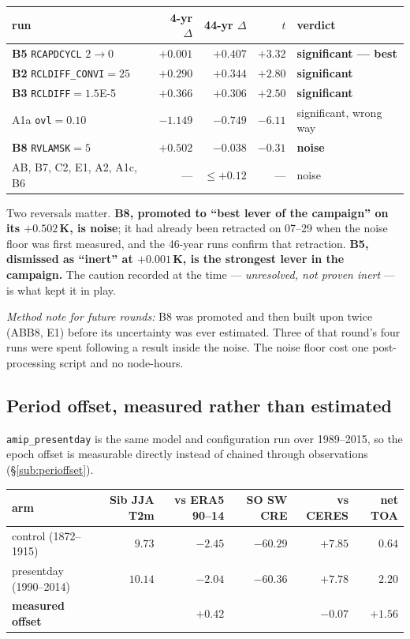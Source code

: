 \documentclass[10pt]{article}
\begin{document}
\begin{center}\footnotesize
\begin{tabular}{l r r r l}
\toprule
run & 4-yr $\Delta$ & \textbf{44-yr $\Delta$} & $t$ & verdict \\
\midrule
\textbf{B5} \texttt{RCAPDCYCL} $2\to0$   & $+0.001$ & $\mathbf{+0.407}$ & $+3.32$ & \textbf{significant --- best} \\
\textbf{B2} \texttt{RCLDIFF\_CONVI}$=25$ & $+0.290$ & $\mathbf{+0.344}$ & $+2.80$ & \textbf{significant} \\
\textbf{B3} \texttt{RCLDIFF}$=1.5$E-5    & $+0.366$ & $\mathbf{+0.306}$ & $+2.50$ & \textbf{significant} \\
A1a \texttt{ovl}$=0.10$                  & $-1.149$ & $-0.749$ & $-6.11$ & significant, wrong way \\
\textbf{B8} \texttt{RVLAMSK}$=5$         & $\mathbf{+0.502}$ & $\mathbf{-0.038}$ & $-0.31$ & \textbf{noise} \\
AB, B7, C2, E1, A2, A1c, B6              & --- & $\le+0.12$ & --- & noise \\
\bottomrule
\end{tabular}
\end{center}

\noindent Two reversals matter. \textbf{B8, promoted to ``best lever of the campaign'' on its $+0.502$\,K, is
noise}; it had already been retracted on 07--29 when the noise floor was first measured, and the 46-year runs
confirm that retraction. \textbf{B5, dismissed as ``inert'' at $+0.001$\,K, is the strongest lever in the
campaign.} The caution recorded at the time --- \emph{unresolved, not proven inert} --- is what kept it in play.

\emph{Method note for future rounds:} B8 was promoted and then built upon twice (ABB8, E1) before its uncertainty
was ever estimated. Three of that round's four runs were spent following a result inside the noise. The noise
floor cost one post-processing script and no node-hours.

\subsection{Period offset, measured rather than estimated}\label{sub:perdirect}
\texttt{amip\_presentday} is the same model and configuration run over 1989--2015, so the epoch offset is
measurable directly instead of chained through observations (\S\ref{sub:perioffset}).

\begin{center}\footnotesize
\begin{tabular}{l r r r r r}
\toprule
arm & Sib JJA T2m & vs ERA5 90--14 & SO SW CRE & vs CERES & net TOA \\
\midrule
control (1872--1915)     & $9.73$  & $\mathbf{-2.45}$ & $-60.29$ & $\mathbf{+7.85}$ & $0.64$ \\
presentday (1990--2014)  & $10.14$ & $\mathbf{-2.04}$ & $-60.36$ & $\mathbf{+7.78}$ & $2.20$ \\
\textbf{measured offset} &         & $\mathbf{+0.42}$ &          & $\mathbf{-0.07}$ & $+1.56$ \\
\bottomrule
\end{tabular}
\end{center}
\end{document}

